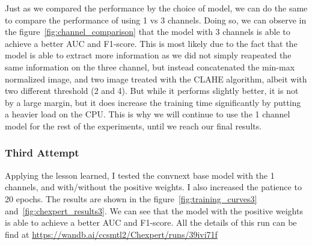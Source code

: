 \documentclass[11pt]{article}
\begin{document}
                Just as we compared the performance by the choice of model, we can do the same to compare the performance of using 1 vs 3 channels. Doing so, we can observe
                in the figure~\ref{fig:channel_comparison} that the model with 3 channels is able to achieve a better AUC and F1-score. This is most likely due to the fact that the model is able to
                extract more information as we did not simply reapeated the same information on the three channel, but instead concatenated the min-max normalized image, and two image treated
                with the CLAHE algorithm, albeit with two different threshold (2 and 4). But while it performs slightly better, it is not by a large margin, but it does increase the training time significantly
                by putting a heavier load on the CPU. This is why we will continue to use the 1 channel model for the rest of the experiments, until we reach our final results.

            \subsubsection{Third Attempt}
            Applying the lesson learned, I tested the convnext base model with the 1 channels, and with/without the positive weights. I also increased the patience to 20 epochs.
            The results are shown in the figure~\ref{fig:training_curves3} and~\ref{fig:chexpert_results3}. We can see that the model with the positive weights is able to achieve a better AUC and F1-score.
            All the details of this run can be find at \url{https://wandb.ai/ccsmtl2/Chexpert/runs/39ivi71f}
\end{document}
